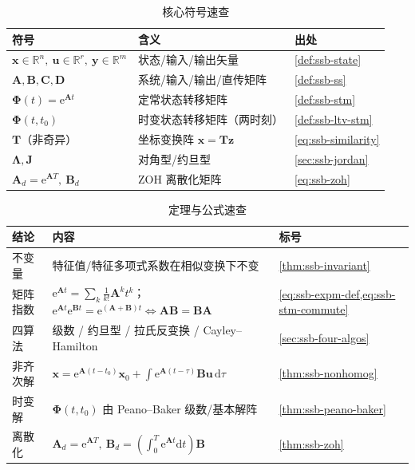 \begin{table}[H]\centering\small
\caption{核心符号速查}
\label{tab:ssb-symbols}
\begin{tabular}{lll}
\toprule
符号 & 含义 & 出处 \\
\midrule
$\mathbf{x}\in\mathbb{R}^n,\ \mathbf{u}\in\mathbb{R}^r,\ \mathbf{y}\in\mathbb{R}^m$ & 状态/输入/输出矢量 & \cref{def:ssb-state} \\
$\mathbf{A},\mathbf{B},\mathbf{C},\mathbf{D}$ & 系统/输入/输出/直传矩阵 & \cref{def:ssb-ss} \\
$\boldsymbol{\Phi}(t)=\mathrm{e}^{\mathbf{A}t}$ & 定常状态转移矩阵 & \cref{def:ssb-stm} \\
$\boldsymbol{\Phi}(t,t_0)$ & 时变状态转移矩阵（两时刻）& \cref{def:ssb-ltv-stm} \\
$\mathbf{T}$（非奇异）& 坐标变换阵 $\mathbf{x}=\mathbf{T}\mathbf{z}$ & \cref{eq:ssb-similarity} \\
$\boldsymbol{\Lambda},\mathbf{J}$ & 对角型/约旦型 & \cref{sec:ssb-jordan} \\
$\mathbf{A}_d=\mathrm{e}^{\mathbf{A}T},\ \mathbf{B}_d$ & ZOH 离散化矩阵 & \cref{eq:ssb-zoh} \\
\bottomrule
\end{tabular}
\end{table}

\begin{table}[H]\centering\small
\caption{定理与公式速查}
\label{tab:ssb-theorems}
\begin{tabular}{lll}
\toprule
结论 & 内容 & 标号 \\
\midrule
不变量 & 特征值/特征多项式系数在相似变换下不变 & \cref{thm:ssb-invariant} \\
矩阵指数 & $\mathrm{e}^{\mathbf{A}t}=\sum_k\tfrac{1}{k!}\mathbf{A}^k t^k$；$\mathrm{e}^{\mathbf{A}t}\mathrm{e}^{\mathbf{B}t}{=}\mathrm{e}^{(\mathbf{A}+\mathbf{B})t}{\iff}\mathbf{A}\mathbf{B}{=}\mathbf{B}\mathbf{A}$ & \cref{eq:ssb-expm-def,eq:ssb-stm-commute} \\
四算法 & 级数 / 约旦型 / 拉氏反变换 / Cayley--Hamilton & \cref{sec:ssb-four-algos} \\
非齐次解 & $\mathbf{x}=\mathrm{e}^{\mathbf{A}(t-t_0)}\mathbf{x}_0+\int\mathrm{e}^{\mathbf{A}(t-\tau)}\mathbf{B}\mathbf{u}\,\mathrm{d}\tau$ & \cref{thm:ssb-nonhomog} \\
时变解 & $\boldsymbol{\Phi}(t,t_0)$ 由 Peano--Baker 级数/基本解阵 & \cref{thm:ssb-peano-baker} \\
离散化 & $\mathbf{A}_d=\mathrm{e}^{\mathbf{A}T},\ \mathbf{B}_d=(\int_0^T\mathrm{e}^{\mathbf{A}t}\mathrm{d}t)\mathbf{B}$ & \cref{thm:ssb-zoh} \\
\bottomrule
\end{tabular}
\end{table}

